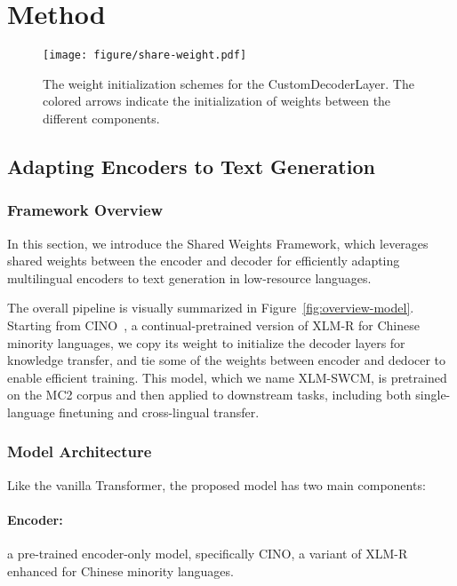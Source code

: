 \section{Method}\label{sec:method}


\begin{figure}
    \centering
    \texttt{[image: figure/share-weight.pdf]}
    \caption{The weight initialization schemes for the CustomDecoderLayer. The colored arrows indicate the initialization of weights between the different components.}
    \label{fig:decoder-initialization}
\end{figure}


\subsection{Adapting Encoders to Text Generation}



\subsubsection{Framework Overview}
In this section, we introduce the Shared Weights Framework, which leverages shared weights between the encoder and decoder for efficiently adapting multilingual encoders to text generation in low-resource languages. 

The overall pipeline is visually summarized in Figure~\ref{fig:overview-model}. Starting from CINO~\citep{cino}, a continual-pretrained version of XLM-R for Chinese minority languages, we copy its weight to initialize the decoder layers for knowledge transfer, and tie some of the weights between encoder and dedocer to enable efficient training. This model, which we name XLM-SWCM, is pretrained on the MC2 corpus and then applied to downstream tasks, including both single-language finetuning and cross-lingual transfer.

\subsubsection{Model Architecture}
Like the vanilla Transformer, the proposed model has two main components:

\paragraph{Encoder:} a pre-trained encoder-only model, specifically CINO, a variant of XLM-R enhanced for Chinese minority languages.

